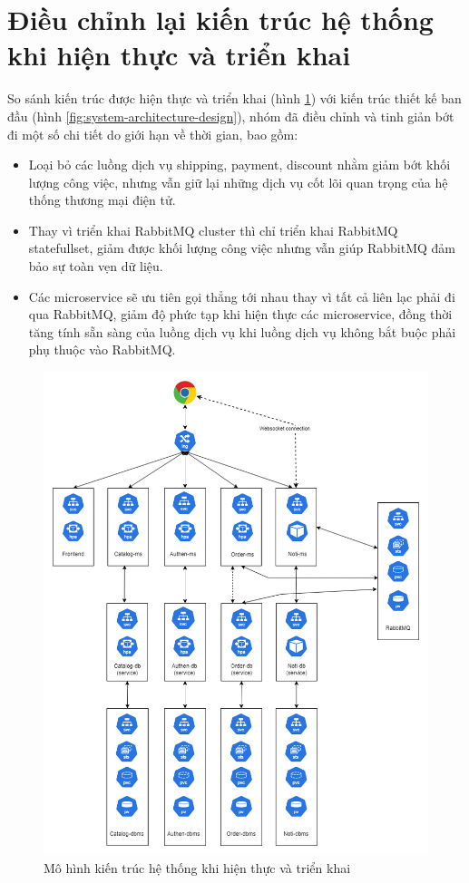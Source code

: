 \section{Điều chỉnh lại kiến trúc hệ thống khi hiện thực và triển khai}
\noindent So sánh kiến trúc được hiện thực và triển khai (hình \ref{fig:architecture-deploy}) với kiến trúc thiết kế ban đầu (hình \ref{fig:system-architecture-design}), nhóm đã điều chỉnh và tinh giản bớt đi một số chi tiết do giới hạn về thời gian, bao gồm:
\begin{itemize}
    \item Loại bỏ các luồng dịch vụ shipping, payment, discount nhằm giảm bớt khối lượng công việc, nhưng vẫn giữ lại những dịch vụ cốt lõi quan trọng của hệ thống thương mại điện tử.
    \item Thay vì triển khai RabbitMQ cluster thì chỉ triển khai RabbitMQ statefullset, giảm được khối lượng công việc nhưng vẫn giúp RabbitMQ đảm bảo sự toàn vẹn dữ liệu.
    \item Các microservice sẽ ưu tiên gọi thẳng tới nhau thay vì tất cả liên lạc phải đi qua RabbitMQ, giảm độ phức tạp khi hiện thực các microservice, đồng thời tăng tính sẵn sàng của luồng dịch vụ khi luồng dịch vụ không bắt buộc phải phụ thuộc vào RabbitMQ.
\end{itemize}
\begin{figure}[H]
    \begin{center}
        \includegraphics[scale = 0.5]{images/hanh/DATN_architecture}
    \end{center}
    \caption{Mô hình kiến trúc hệ thống khi hiện thực và triển khai}
    \label{fig:architecture-deploy}
  
\end{figure}
